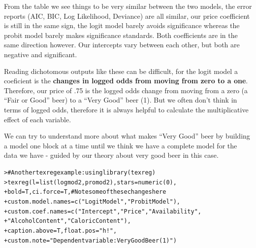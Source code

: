 \documentclass[12pt]{article}\usepackage[]{graphicx}\usepackage[]{color}
\makeatletter
\newcommand{\hlnum}[1]{\textcolor[rgb]{0.82,0.78,0.62}{#1}}%
\newcommand{\hlstr}[1]{\textcolor[rgb]{0.82,0.78,0.62}{#1}}%
\newcommand{\hlcom}[1]{\textcolor[rgb]{0.404,0.408,0.42}{#1}}%
\newcommand{\hlstd}[1]{\textcolor[rgb]{0.882,0.878,0.898}{#1}}%
\newcommand{\hlkwc}[1]{\textcolor[rgb]{0.812,0.522,0.388}{#1}}%
\newcommand{\hlkwd}[1]{\textcolor[rgb]{0.733,0.388,0.812}{#1}}%
\newenvironment{kframe}{%
 \def\at@end@of@kframe{}%
 \ifinner\ifhmode%
  \def\at@end@of@kframe{\end{minipage}}%
  \begin{minipage}{\columnwidth}%
 \fi\fi%
 \def\FrameCommand##1{\hskip\@totalleftmargin \hskip-\fboxsep
 \colorbox{shadecolor}{##1}\hskip-\fboxsep
     \hskip-\linewidth \hskip-\@totalleftmargin \hskip\columnwidth}%
 \MakeFramed {\advance\hsize-\width
   \@totalleftmargin\z@ \linewidth\hsize
   \@setminipage}}%
 {\par\unskip\endMakeFramed%
 \at@end@of@kframe}
\newenvironment{knitrout}{}{} %
\makeatother
\begin{document}
\begin{flushleft}
From the table we see things to be very similar between the two models, the error reports (AIC, BIC, Log Likelihood, Deviance) are all similar, our price coefficient is still in the same sign, the logit model barely avoids significance whereas the probit model barely makes significance standards. Both coefficients are in the same direction however. Our intercepts vary between each other, but both are negative and significant.

Reading dichotomous outputs like these can be difficult, for the logit model a coeficient is the \textbf{changes in logged odds from moving from zero to a one}. Therefore, our price of .75 is the logged odds change from moving from a zero (a ``Fair or Good'' beer) to a ``Very Good'' beer (1). But we often don't think in terms of logged odds, therefore it is always helpful to calculate the multiplicative effect of each variable.

We can try to understand more about what makes ``Very Good'' beer by building a model one block at a time until we think we have a complete model for the data we have - guided by our theory about very good beer in this case.

\begin{knitrout}
\color{fgcolor}\begin{kframe}
\begin{alltt}
\hlstd{> }\hlcom{# Another texreg example: using library(texreg)}
\hlstd{> }\hlkwd{texreg}\hlstd{(}\hlkwc{l}\hlstd{=} \hlkwd{list}\hlstd{(logmod2, promod2),} \hlkwc{stars} \hlstd{=} \hlkwd{numeric}\hlstd{(}\hlnum{0}\hlstd{),}
\hlstd{+ }       \hlkwc{bold} \hlstd{= T,} \hlkwc{ci.force} \hlstd{= T,}   \hlcom{# Note some of these changes here}
\hlstd{+ }       \hlkwc{custom.model.names} \hlstd{=} \hlkwd{c}\hlstd{(}\hlstr{"Logit Model"}\hlstd{,} \hlstr{"Probit Model"}\hlstd{),}
\hlstd{+ }       \hlkwc{custom.coef.names} \hlstd{=} \hlkwd{c}\hlstd{(}\hlstr{"Intercept"}\hlstd{,} \hlstr{"Price"}\hlstd{,} \hlstr{"Availability"}\hlstd{,}
\hlstd{+ }                             \hlstr{"Alcohol Content"}\hlstd{,} \hlstr{"Caloric Content"}\hlstd{),}
\hlstd{+ }       \hlkwc{caption.above} \hlstd{= T,} \hlkwc{float.pos} \hlstd{=} \hlstr{"h!"}\hlstd{,}
\hlstd{+ }       \hlkwc{custom.note} \hlstd{=} \hlstr{"Dependent variable: Very Good Beer (1)"} \hlstd{)}
\end{alltt}
\end{kframe}
\end{knitrout}



\end{flushleft}
\end{document}

